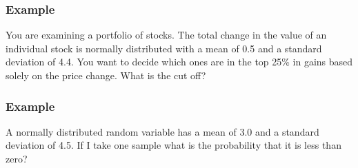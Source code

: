 \begin{frame}
  \frametitle{Example}

  You are examining a portfolio of stocks. The total change in the
  value of an individual stock is normally distributed with a mean of
  0.5 and a standard deviation of 4.4. You want to decide which ones
  are in the top 25\% in gains based solely on the price change. What
  is the cut off?

  \vfill


  \vfill


\end{frame}





\begin{frame}
  \frametitle{Example}

  A normally distributed random variable has a mean of 3.0 and a
  standard deviation of 4.5. If I take one sample what is the
  probability that it is less than zero?

  \vfill


  \vfill

%

\end{frame}

